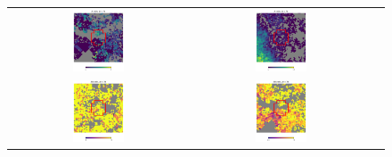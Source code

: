 \documentclass[preprintm,linenumbers]{aastex631}
\begin{document}
\begin{figure}
\begin{tabular}{  c c c}
				\includegraphics[width=0.3\textwidth]{results/skymaps_cutout/skymaps_cutout_first_year_one_snap_v4_0_10yrs_db_noDD_noTwi_tscale-7_nside-256_doAllTemplateMetrics_reduceCount_g_WFD_noDD_noTwi.pdf} &
				\includegraphics[width=0.3\textwidth]{results/skymaps_cutout/skymaps_cutout_first_year_one_snap_v4_0_10yrs_db_noDD_noTwi_tscale-7_nside-256_doAllTemplateMetrics_reduceCount_g_GP_noDD_noTwi.pdf} \\
				\includegraphics[width=0.3\textwidth]{results/skymaps_cutout/skymaps_cutout_delta_first_year_one_snap_v4_0_10yrs_db_noDD_noTwi_tscale-7_nside-256_doAllTemplateMetrics_reduceCount_g_NES_noDD_noTwi.pdf} &
				\includegraphics[width=0.3\textwidth]{results/skymaps_cutout/skymaps_cutout_delta_first_year_one_snap_v4_0_10yrs_db_noDD_noTwi_tscale-7_nside-256_doAllTemplateMetrics_reduceCount_g_WFD_noDD_noTwi.pdf} &

\end{tabular}
\end{figure}
\end{document}
